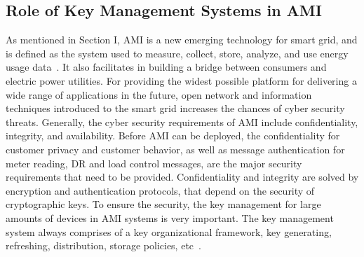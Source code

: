 \subsection{Role of Key Management Systems in AMI}
As mentioned in Section I, AMI is a new emerging technology for smart grid, and is defined as the system used to measure, collect, store, analyze, and use energy usage data~\cite{Xia12}. It also facilitates in building a bridge between consumers and electric power utilities. For providing the widest possible platform for delivering a wide range of applications in the future, open network and information techniques introduced to the smart grid increases the chances of cyber security threats. Generally, the cyber security requirements of AMI include confidentiality, integrity, and availability. Before AMI can be deployed, the confidentiality for customer privacy and customer behavior, as well as message authentication for meter reading, DR and load control messages, are the major security requirements that need to be provided. Confidentiality and integrity are solved by encryption and authentication protocols, that depend on the security of cryptographic keys. To ensure the security, the key management for large amounts of devices in AMI systems is very important. The key management system always comprises of a key organizational framework, key generating, refreshing, distribution, storage policies, etc~\cite{Liu13}.
